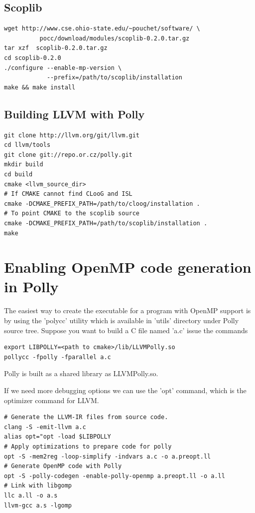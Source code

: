\subsection{Scoplib}
\begin{lstlisting}
wget http://www.cse.ohio-state.edu/~pouchet/software/ \
          pocc/download/modules/scoplib-0.2.0.tar.gz
tar xzf  scoplib-0.2.0.tar.gz
cd scoplib-0.2.0
./configure --enable-mp-version \
            --prefix=/path/to/scoplib/installation 
make && make install
\end{lstlisting}

\subsection{Building LLVM with Polly}
\begin{lstlisting}
git clone http://llvm.org/git/llvm.git
cd llvm/tools
git clone git://repo.or.cz/polly.git
mkdir build
cd build
cmake <llvm_source_dir>
# If CMAKE cannot find CLooG and ISL
cmake -DCMAKE_PREFIX_PATH=/path/to/cloog/installation . 
# To point CMAKE to the scoplib source
cmake -DCMAKE_PREFIX_PATH=/path/to/scoplib/installation . 
make
\end{lstlisting}

\section{Enabling OpenMP code generation in Polly}
The easiest way to create the executable for a program with OpenMP support is by using the 'polycc' utility
which is available in 'utils' directory under Polly source tree. Suppose you want to build a C file
named 'a.c' issue the commands
\begin{lstlisting}
export LIBPOLLY=<path to cmake>/lib/LLVMPolly.so
pollycc -fpolly -fparallel a.c
\end{lstlisting}
Polly is built as a shared library as LLVMPolly.so.

If we need more debugging options we can use the 'opt' command, which is the optimizer command for LLVM.

\begin{lstlisting}
# Generate the LLVM-IR files from source code.
clang -S -emit-llvm a.c
alias opt="opt -load $LIBPOLLY
# Apply optimizations to prepare code for polly
opt -S -mem2reg -loop-simplify -indvars a.c -o a.preopt.ll
# Generate OpenMP code with Polly
opt -S -polly-codegen -enable-polly-openmp a.preopt.ll -o a.ll
# Link with libgomp
llc a.ll -o a.s
llvm-gcc a.s -lgomp
\end{lstlisting}


